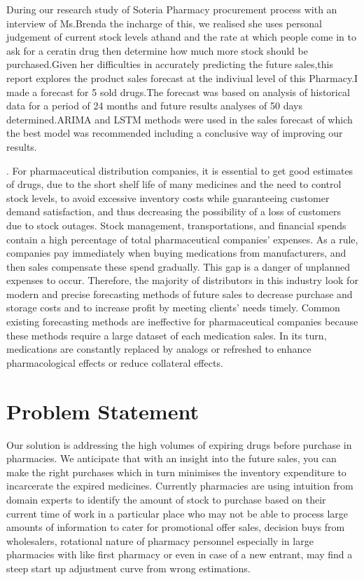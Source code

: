 \documentclass[12pt]{report}
\begin{document}
During our research study of Soteria Pharmacy procurement process with an interview of Ms.Brenda the incharge of this, we realised she uses personal judgement of current stock levels athand and the rate at which people come in to ask for a ceratin drug then determine how much more stock should be purchased.Given her difficulties in accurately predicting the future sales,this report explores the product sales forecast at the indiviual level of this Pharmacy.I made a forecast for 5 sold drugs.The forecast was based on analysis of  historical data for a period of 24 months and future results analyses of 50 days determined.ARIMA and LSTM methods were used in the sales forecast of which the best model was recommended including a conclusive way of improving our results.


. For pharmaceutical distribution companies, it is essential to get good estimates of drugs, due to the short shelf life of many medicines and the need to control stock levels, to avoid excessive inventory costs while guaranteeing customer demand satisfaction, and thus decreasing the possibility of a loss of customers due to stock outages.
Stock management, transportations, and financial spends contain a high percentage of total pharmaceutical companies’ expenses. As a rule, companies pay immediately when buying medications from manufacturers, and then sales compensate these spend gradually. This gap is a danger of unplanned expenses to occur. Therefore, the majority of distributors in this industry look for modern and precise forecasting methods of future sales to decrease purchase and storage costs and to increase profit by meeting clients’ needs timely.
Common existing forecasting methods are ineffective for pharmaceutical companies because these methods require a large dataset of each medication sales. In its turn, medications are constantly replaced by analogs or refreshed to enhance pharmacological effects or reduce collateral effects.
\\




\section{Problem Statement}
Our solution is addressing the high volumes of expiring drugs before purchase in pharmacies.
We anticipate that with an insight into the future sales, you can make the right purchases which
in turn minimises the inventory expenditure to incarcerate the expired medicines. Currently
pharmacies are using intuition from domain experts to identify the amount of stock to purchase
based on their current time of work in a particular place who may not be able to process large
amounts of information to cater for promotional offer sales, decision buys from wholesalers,
rotational nature of pharmacy personnel especially in large pharmacies with like first pharmacy
or even in case of a new entrant, may find a steep start up adjustment curve from wrong
estimations.
\end{document}
